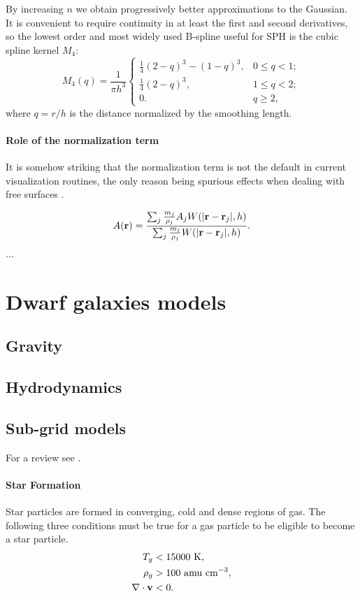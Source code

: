 By increasing $n$ we obtain progressively better approximations to the Gaussian. It is convenient to require continuity in at least the first and second derivatives, so the lowest order and most widely used B-spline useful for SPH is the cubic spline kernel $M_4$:
\begin{equation}
M_4(q) = \frac{1}{\pi h^3} \left\{
\begin{array}{ll}
\frac{1}{4}(2-q)^3 - (1 - q)^{3}, & 0 \le q < 1; \\
\frac{1}{4}(2-q)^3, & 1 \le q < 2; \\
0. & q \ge 2,
\end{array}
\right.
\label{eq:cubicspline}
\end{equation}
where $q=r/h$ is the distance normalized by the smoothing length.

\paragraph{Role of the normalization term}
It is somehow striking that the normalization term is not the default in current visualization routines, the only reason being spurious effects when dealing with free surfaces \citep{Price2007}.

\begin{equation}
 A(\boldsymbol{\mathbf{r}}) = \dfrac{\sum_j \frac{m_j}{\rho_j} A_j W(|\boldsymbol{\mathbf{r}} - \boldsymbol{\mathbf{r}}_j|,h)}{\sum_j \frac{m_j}{\rho_j} W(|\boldsymbol{\mathbf{r}} - \boldsymbol{\mathbf{r}}_j|,h)}.
\end{equation}
...

\section{Dwarf galaxies models}
\citet{Verbeke2017}
\subsection{Gravity}
\subsection{Hydrodynamics}
\subsection{Sub-grid models}
For a review see \citet{Verbeke2017, Vandenbroucke2016}.

\paragraph{Star Formation}
Star particles are formed in converging, cold and dense regions of gas.
The following three conditions must be true for a gas particle to be eligible to become a star particle.
\begin{align*}
 T_g &< 15000 \text{~K},\\
 \rho_g &> 100 \text{~amu~cm}^{-3},\\
 \nabla \cdot \boldsymbol{\mathbf{v}} & < 0.
\end{align*}

